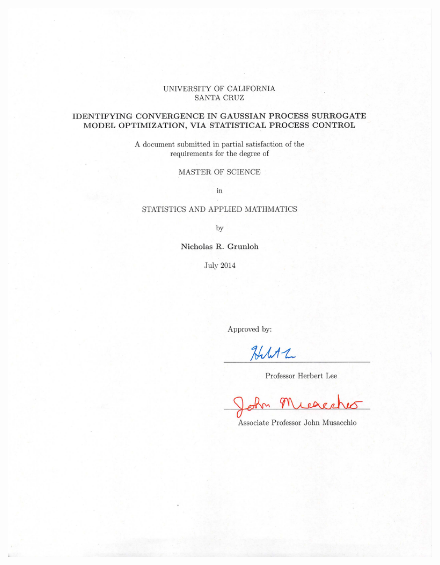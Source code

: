 \documentclass[12pt]{article}
\begin{document}
%
%
% 
\begin{figure}
\vspace{-4cm}
\hspace{-4cm}
\includegraphics[width=1.5\textwidth]{./figures/titlePage.pdf}
\end{figure}
\clearpage
\tableofcontents
{}
\clearpage
{}
%
%
\end{document}
